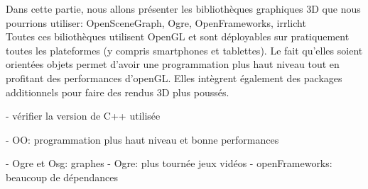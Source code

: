 Dans cette partie, nous allons présenter les bibliothèques graphiques 3D que nous pourrions utiliser: OpenSceneGraph, Ogre, OpenFrameworks, irrlicht \\
Toutes ces biliothèques utilisent OpenGL et sont déployables sur pratiquement toutes les plateformes (y compris smartphones et tablettes). Le fait qu'elles soient orientées objets permet d'avoir une programmation plus haut niveau tout en profitant des performances d'openGL. Elles intègrent également des packages additionnels pour faire des rendus 3D plus poussés.

- vérifier la version de C++ utilisée

- OO: programmation plus haut niveau et bonne performances

- Ogre et Osg: graphes
- Ogre: plus tournée jeux vidéos 
- openFrameworks: beaucoup de dépendances

